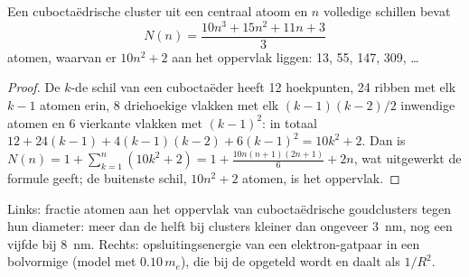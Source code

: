 \begin{proposition}\label{prop:b3:inorganic-materials:magic}
Een cuboctaëdrische cluster uit een centraal atoom en $n$ volledige schillen bevat
\[
  N(n) = \frac{10n^3 + 15n^2 + 11n + 3}{3}
\]
atomen, waarvan er $10n^2 + 2$ aan het oppervlak liggen: 13, 55, 147, 309, \dots
\end{proposition}

\begin{proof}
De $k$-de schil van een cuboctaëder heeft 12 hoekpunten, 24 ribben met elk $k - 1$ atomen
erin, 8 driehoekige vlakken met elk $(k - 1)(k - 2)/2$ inwendige atomen en 6
vierkante vlakken met $(k - 1)^2$: in totaal $12 + 24(k - 1) + 4(k - 1)(k - 2) + 6(k - 1)^2 = 10k^2 + 2$. Dan is
$N(n) = 1 + \sum_{k=1}^{n}(10k^2 + 2) = 1 + \frac{10n(n + 1)(2n + 1)}{6} + 2n$, wat uitgewerkt de formule geeft; de
buitenste schil, $10n^2 + 2$ atomen, is het oppervlak.
\end{proof}

\begin{omfigure}

{\small Links: fractie atomen aan het oppervlak van cuboctaëdrische
goudclusters tegen hun diameter: meer dan de helft bij clusters kleiner
dan ongeveer
\qty{3}{nm}, nog een vijfde bij \qty{8}{nm}. Rechts: opsluitingsenergie
van een elektron-gatpaar in een bolvormige  (model met
 $0.10\,m_e$),
die bij de  opgeteld wordt en daalt als $1/R^2$.}
\end{omfigure}

